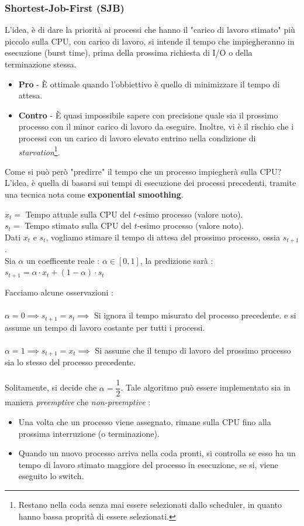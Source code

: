 \documentclass[12pt, letterpaper]{article}
\newcommand{\acc}{\\\hphantom{}\\}
\begin{document}
\subsubsection{Shortest-Job-First (SJB)}
L'idea, è di dare la priorità ai processi che hanno il 
"carico di lavoro stimato" più piccolo sulla CPU, con carico di lavoro, si 
intende il tempo che impiegheranno in esecuzione (burst time), prima della prossima 
richiesta di I/O o della terminazione stessa.\begin{itemize}
    \item \textbf{Pro} - È ottimale quando l'obbiettivo è quello di 
    minimizzare il tempo di attesa.
    \item \textbf{Contro} - È quasi impossibile sapere con precisione 
    quale sia il prossimo processo con il minor carico di lavoro da eseguire.
    Inoltre, vi è il rischio che i processi con un carico di lavoro 
    elevato entrino nella condizione di \textit{starvation}\footnote{
        Restano nella coda senza mai essere selezionati dallo scheduler, 
        in quanto hanno bassa proprità di essere selezionati.
    }.
\end{itemize}
Come si può però "predirre" il tempo che un processo impiegherà sulla 
CPU? L'idea, è quella di basarsi sui tempi di esecuzione dei processi 
precedenti, tramite una tecnica nota come \textbf{exponential smoothing}.\begin{center}
    \(x_t=\) Tempo attuale sulla CPU del \(t\)-esimo processo (valore noto). 
    \\\(s_t=\)  Tempo stimato sulla CPU del \(t\)-esimo processo (valore noto).
    \\Dati \(x_t\) e \(s_t\), vogliamo stimare il tempo di attesa del prossimo processo, 
    ossia \(s_{t+1}\). \\
    Sia \(\alpha\) un coefficente reale : \(\alpha\in [0,1]\), la predizione sarà :\\
\(s_{t+1}=\alpha\cdot x_t+(1-\alpha)\cdot s_t\)
\end{center}
Facciamo alcune osservazioni :\acc
    \(\alpha=0\implies s_{t+1}=s_t\implies\) Si ignora il tempo misurato del processo 
    precedente. e si assume un tempo di lavoro costante per tutti i processi.\acc 
    \(\alpha=1\implies s_{t+1}=x_t\implies\) Si assume che il tempo di lavoro 
    del prossimo processo sia lo stesso del processo precedente.\acc 
Solitamente, si decide che \(\alpha=\dfrac{1}{2}\). Tale algoritmo può essere implementato 
sia in maniera \textit{preemptive} che \textit{non-preemptive} : \begin{itemize}
    \item Una volta che un processo viene assegnato, rimane sulla CPU fino alla prossima 
    interruzione (o terminazione).
    \item Quando un nuovo processo arriva nella coda pronti, si controlla se 
    esso ha un tempo di lavoro stimato maggiore del processo in esecuzione, se si, 
    viene eseguito lo switch.
\end{itemize}
\end{document}
